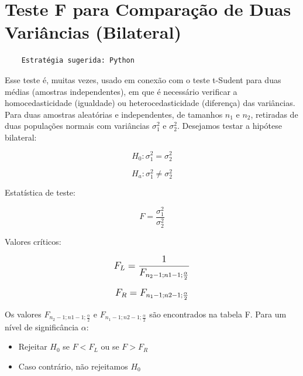\section{Teste F para Comparação de Duas Variâncias (Bilateral)}

\begin{verbatim}
	Estratégia sugerida: Python 
\end{verbatim}

Esse teste é, muitas vezes, usado em conexão com o teste t-Sudent para duas médias (amostras
independentes), em que é necessário verificar a homocedasticidade (igualdade) ou
heterocedasticidade (diferença) das variâncias. Para duas amostras aleatórias e independentes, de tamanhos \(n_1\) e \(n_2\), retiradas de duas populações normais com variâncias \(\sigma_1^2\) e
\(\sigma_2^2\). Desejamos testar a hipótese bilateral: 

\[H_0: \sigma_1^2 = \sigma_2^2\]

\[H_a: \sigma_1^2 \neq \sigma_2^2\]

Estatística de teste:

\[ F = \frac{\sigma_1^2}{\sigma_2^2} \]

Valores críticos:

\[\beq{ F_L = \frac{1}{F_{n_2-1;n1-1;\frac{\alpha}{2}}} }\]

\[\beq{ F_R = F_{n_1-1;n2-1;\frac{\alpha}{2}} }\]

Os valores \( F_{n_2-1;n1-1;\frac{\alpha}{2}} \) e \(F_{n_1-1;n2-1;\frac{\alpha}{2}}\) são encontrados na  tabela F. Para um nível de significância \(\alpha\):
\begin{itemize}
	\item Rejeitar \(H_0\) se \(F < F_L\) ou se \(F>F_R\)
	\item Caso contrário, não rejeitamos \(H_0\)
\end{itemize} 